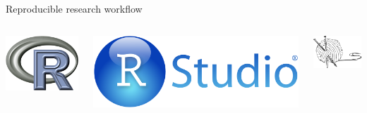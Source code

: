 \documentclass[serif]{beamer}\usepackage[]{graphicx}\usepackage[]{color}
\begin{document}
\begin{frame}{Reproducible research workflow}
\begin{columns}
\begin{column}{0.23\textwidth}
\centerline{\includegraphics[width = \textwidth]{fig/Rlogo.png}}
\end{column}
\begin{column}{0.23\textwidth}
\centerline{\includegraphics[width = \textwidth]{fig/RStudio.png}}
\end{column}
\begin{column}{0.23\textwidth}
\centerline{\includegraphics[width = \textwidth]{fig/knit-logo.png}}

\end{column}
\end{columns}
\end{frame}
\end{document}
